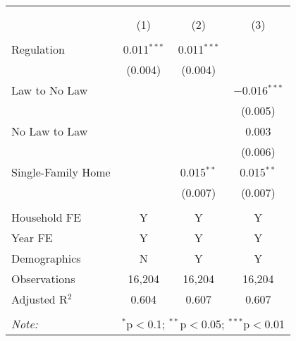 
\begin{table}[!htbp] \centering 
  \caption{} 
  \label{} 
\begin{tabular}{@{\extracolsep{5pt}}lccc} 
\\[-1.8ex]\hline 
\hline \\[-1.8ex] 
\\[-1.8ex] & (1) & (2) & (3)\\ 
\hline \\[-1.8ex] 
 Regulation & 0.011$^{***}$ & 0.011$^{***}$ &  \\ 
  & (0.004) & (0.004) &  \\ 
  Law to No Law &  &  & $-$0.016$^{***}$ \\ 
  &  &  & (0.005) \\ 
  No Law to Law &  &  & 0.003 \\ 
  &  &  & (0.006) \\ 
  Single-Family Home &  & 0.015$^{**}$ & 0.015$^{**}$ \\ 
  &  & (0.007) & (0.007) \\ 
 \hline \\[-1.8ex] 
Household FE & Y & Y & Y \\ 
Year FE & Y & Y & Y \\ 
Demographics & N & Y & Y \\ 
Observations & 16,204 & 16,204 & 16,204 \\ 
Adjusted R$^{2}$ & 0.604 & 0.607 & 0.607 \\ 
\hline 
\hline \\[-1.8ex] 
\textit{Note:}  & \multicolumn{3}{l}{$^{*}$p$<$0.1; $^{**}$p$<$0.05; $^{***}$p$<$0.01} \\ 
\end{tabular} 
\end{table} 
